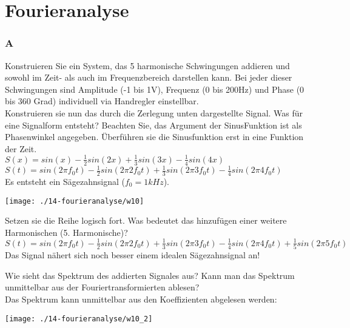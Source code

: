 

\section{Fourieranalyse}

\subsubsection{A}
Konstruieren Sie ein System, das 5 harmonische Schwingungen addieren und sowohl im Zeit- als auch im Frequenzbereich darstellen kann. Bei jeder dieser Schwingungen sind Amplitude (-1 bis 1V), Frequenz (0 bis 200Hz) und Phase (0 bis 360 Grad) individuell via Handregler einstellbar.\\

Konstruieren sie nun das durch die Zerlegung unten dargestellte Signal. Was für eine Signalform entsteht? Beachten Sie, das Argument der SinusFunktion ist als Phasenwinkel angegeben.
Überführen sie die Sinusfunktion erst in eine Funktion der Zeit.\\
$S(x)=sin(x)-\frac{1}{2}sin(2x)+\frac{1}{3}sin(3x)-\frac{1}{4}sin(4x)$\\
$S(t)=sin(2\pi f_0t)-\frac{1}{2}sin(2\pi 2f_0t)+\frac{1}{3}sin(2\pi 3f_0t)-\frac{1}{4}sin(2\pi 4f_0t)$\\
Es entsteht ein Sägezahnsignal ($f_0=1kHz$).
\begin{center}
    \vspace{-8pt}
    \texttt{[image: ./14-fourieranalyse/w10]}
    \vspace{-8pt}
\end{center}

Setzen sie die Reihe logisch fort. Was bedeutet das hinzufügen einer weitere Harmonischen (5. Harmonische)?\\
$S(t)=sin(2\pi f_0t)-\frac{1}{2}sin(2\pi 2f_0t)+\frac{1}{3}sin(2\pi 3f_0t)-\frac{1}{4}sin(2\pi 4f_0t)+\frac{1}{5}sin(2\pi 5f_0t)$\\
Das Signal nähert sich noch besser einem idealen Sägezahnsignal an!

Wie sieht das Spektrum des addierten Signales aus? Kann man das Spektrum unmittelbar aus der Fouriertransformierten ablesen?\\
Das Spektrum kann unmittelbar aus den Koeffizienten abgelesen werden:
\begin{center}
    \vspace{-8pt}
    \texttt{[image: ./14-fourieranalyse/w10\_2]}
    \vspace{-8pt}
\end{center}

